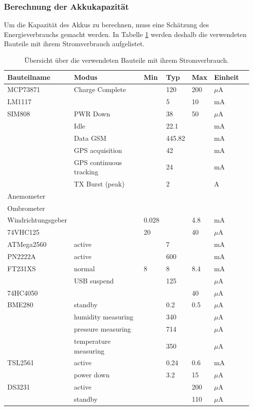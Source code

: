 \subsubsection{Berechnung der Akkukapazität}
Um die Kapazität des Akkus zu berechnen, muss eine Schätzung des Energieverbrauchs gemacht werden. In Tabelle \ref{tab:Energieverbrauch} werden deshalb die verwendeten Bauteile mit ihrem Stromverbrauch aufgelistet.
\begin{table}[h]
	\centering
	\caption{Übersicht über die verwendeten Bauteile mit ihrem Stromverbrauch.}
	\small
  \begin{tabular}{lllllll}
  \toprule 
  \textbf{Bauteilname} & \textbf{Modus} & \textbf{Min} & \textbf{Typ} & \textbf{Max} & \textbf{Einheit}\\ 
  \midrule 
  MCP73871 \cite{MCP73871}& Charge Complete &  & 120 & 200 & $\mu$A  \\ 
  \hline 
  LM1117 \cite{LM1117} &  & & 5 & 10 & mA   \\ 
  \hline 
  SIM808 \cite{SIM808}& PWR Down &  & 38 & 50 & $\mu$A   \\ 
   & Idle  &  & 22.1 &  & mA  \\ 
   & Data GSM &  & 445.82 &  & mA   \\ 
   & GPS acquisition &  & 42 &  & mA   \\ 
   & GPS continuous tracking &  & 24 &  & mA   \\ 
   & TX Burst (peak)  &  & 2 &  & A  \\ 
  \hline 
  Anemometer &  &  &  &  &   \\ 
  \hline 
  Ombrometer &  &  &  &  &   \\ 
  \hline 
  Windrichtungsgeber \cite{ADSkeineAngabe}&  & 0.028 &  & 4.8 & mA \\ 
  \hline 
  74VHC125 \cite{74HC125}&  & 20 &  & 40 & $\mu$A  \\ 
  \hline 
  ATMega2560 \cite{arduinoMega}& active &  & 7 &  & mA  \\ 
  \hline
  PN2222A & active &  & 600 &  & mA  \\
  \hline 
  FT231XS \cite{FTDI}& normal & 8 & 8 & 8.4 & mA \\ 
   & USB suspend &  & 125 &  & $\mu$A \\ 
  \hline 
  74HC4050 \cite{74HC4050}&  &  &  & 40 & $\mu$A \\ 
  \hline 
  BME280 \cite{Bosch2019}& standby &  & 0.2 & 0.5 & $\mu$A  \\ 
   & humidity measuring &  & 340 &  & $\mu$A \\ 
   & pressure measuring &  & 714 &  & $\mu$A  \\ 
   & temperature measuring &  & 350 &  & $\mu$A \\ 
  \hline 
  TSL2561 \cite{TSL2561}& active &  & 0.24 & 0.6 & mA \\ 
   & power down &  & 3.2 & 15 & $\mu$A  \\ 
  \hline 
  DS3231 \cite{DS3231DS}& active & &  & 200 & $\mu$A \\ 
   & standby &  & & 110 & $\mu$A  \\ 
  \bottomrule 
  \end{tabular} 
	\label{tab:Energieverbrauch} 
\end{table}

